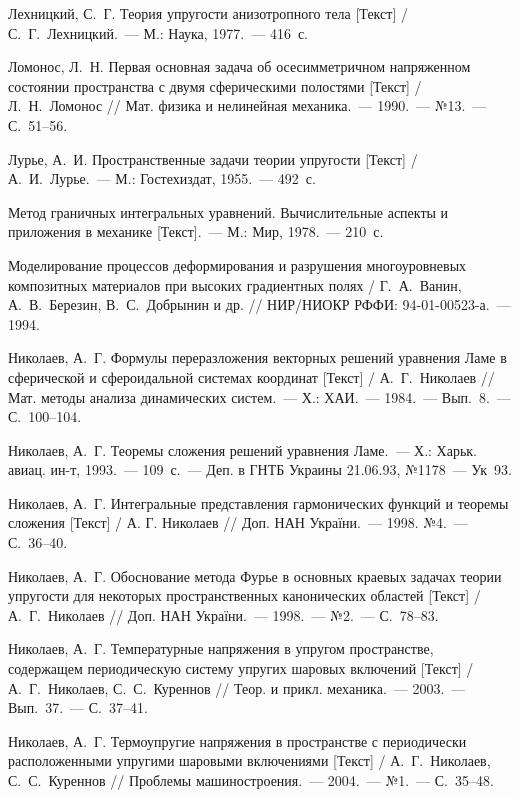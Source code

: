 \begin{biblist}{99}
Лехницкий, С.~Г. 
Теория упругости анизотропного тела [Текст] 
/ С.~Г.~Лехницкий.~--- М.: Наука, 1977.~--- 416~с.

Ломонос, Л.~Н. 
Первая основная задача об осесимметричном напряженном состоянии пространства с двумя сферическими полостями [Текст] 
/ Л.~Н.~Ломонос 
// Мат. физика и нелинейная механика.~--- 1990.~--- №13.~--- С.~51--56.

Лурье, А.~И. 
Пространственные задачи теории упругости [Текст] 
/ А.~И.~Лурье.~--- М.: Гостехиздат, 1955.~--- 492~с.

Метод граничных интегральных уравнений. Вычислительные аспекты и приложения в механике [Текст].~--- М.: Мир, 1978.~--- 210~с.

Моделирование процессов деформирования и разрушения многоуровневых композитных материалов при высоких градиентных полях 
/ Г.~А.~Ванин, А.~В.~Березин, В.~С.~Добрынин и др. 
// НИР/НИОКР РФФИ: 94-01-00523-а.~--- 1994.


Николаев, А.~Г. 
Формулы переразложения векторных решений уравнения Ламе в сферической и сфероидальной системах координат [Текст] 
/ А.~Г.~Николаев 
// Мат. методы анализа динамических систем.~--- Х.: ХАИ.~--- 1984.~--- Вып.~8.~--- С.~100--104.

Николаев, А.~Г. 
Теоремы сложения решений уравнения Ламе.~--- Х.: Харьк. авиац. ин-т, 1993.~--- 109~с.~--- Деп. в ГНТБ Украины 21.06.93, №1178~--- Ук~93.

Николаев, А.~Г. 
Интегральные представления гармонических функций и теоремы сложения [Текст] 
/ А. Г. Николаев // Доп. НАН України.~--- 1998. №4.~--- С.~36--40.

Николаев, А.~Г. 
Обоснование метода Фурье в основных краевых задачах теории упругости для некоторых пространственных канонических областей [Текст] 
/ А.~Г.~Николаев 
// Доп. НАН України.~--- 1998.~--- №2.~--- С.~78--83.

Николаев, А.~Г. 
Температурные напряжения в упругом пространстве, содержащем периодическую систему упругих шаровых включений [Текст] 
/ А.~Г.~Николаев, С.~С.~Куреннов 
// Теор. и прикл. механика.~--- 2003.~--- Вып.~37.~--- С.~37--41.

Николаев, А.~Г. 
Термоупругие напряжения в пространстве с периодически расположенными упругими шаровыми включениями [Текст] 
/ А.~Г.~Николаев, С.~С.~Куреннов 
// Проблемы машиностроения.~--- 2004.~--- №1.~--- С.~35--48.


\end{biblist}
